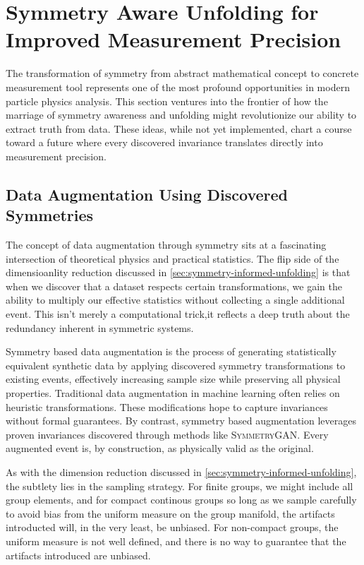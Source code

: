 \section{Symmetry Aware Unfolding for Improved Measurement Precision}
    The transformation of symmetry from abstract mathematical concept to concrete measurement tool represents one of the most profound opportunities in modern particle physics analysis.
    This section ventures into the frontier of how the marriage of symmetry awareness and unfolding might revolutionize our ability to extract truth from data.
    These ideas, while not yet implemented, chart a course toward a future where every discovered invariance translates directly into measurement precision.
    \subsection{Data Augmentation Using Discovered Symmetries}
        The concept of data augmentation through symmetry sits at a fascinating intersection of theoretical physics and practical statistics.
        The flip side of the dimensioanlity reduction discussed in \cref{sec:symmetry-informed-unfolding} is that when we discover that a dataset respects certain transformations, we gain the ability to multiply our effective statistics without collecting a single additional event.
        This isn't merely a computational trick,it reflects a deep truth about the redundancy inherent in symmetric systems.

        Symmetry based data augmentation is the process of generating statistically equivalent synthetic data by applying discovered symmetry transformations to existing events, effectively increasing sample size while preserving all physical properties.
        Traditional data augmentation in machine learning often relies on heuristic transformations.
        These modifications hope to capture invariances without formal guarantees.
        By contrast, symmetry based augmentation leverages proven invariances discovered through methods like \textsc{SymmetryGAN}.
        Every augmented event is, by construction, as physically valid as the original.

        As with the dimension reduction discussed in \cref{sec:symmetry-informed-unfolding}, the subtlety lies in the sampling strategy.
        For finite groups, we might include all group elements, and for compact continous groups so long as we sample carefully to avoid bias from the uniform measure on the group manifold, the artifacts introducted will, in the very least, be unbiased.
        For non-compact groups, the uniform measure is not well defined, and there is no way to guarantee that the artifacts introduced are unbiased.

